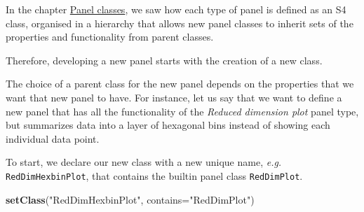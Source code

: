 \documentclass[]{book}
\newenvironment{Shaded}{\begin{snugshade}}{\end{snugshade}}
\newcommand{\DataTypeTok}[1]{\textcolor[rgb]{0.13,0.29,0.53}{#1}}
\newcommand{\KeywordTok}[1]{\textcolor[rgb]{0.13,0.29,0.53}{\textbf{#1}}}
\newcommand{\NormalTok}[1]{#1}
\newcommand{\StringTok}[1]{\textcolor[rgb]{0.31,0.60,0.02}{#1}}
\begin{document}
In the chapter \protect\hyperlink{panels}{Panel classes}, we saw how each type of panel is defined as an S4 class, organised in a hierarchy that allows new panel classes to inherit sets of the properties and functionality from parent classes.

Therefore, developing a new panel starts with the creation of a new class.

The choice of a parent class for the new panel depends on the properties that we want that new panel to have.
For instance, let us say that we want to define a new panel that has all the functionality of the \emph{Reduced dimension plot} panel type, but summarizes data into a layer of hexagonal bins instead of showing each individual data point.

To start, we declare our new class with a new unique name, \emph{e.g.} \texttt{RedDimHexbinPlot}, that contains the builtin panel class \texttt{RedDimPlot}.

\begin{Shaded}
\begin{Highlighting}[]
\KeywordTok{setClass}\NormalTok{(}\StringTok{"RedDimHexbinPlot"}\NormalTok{, }\DataTypeTok{contains=}\StringTok{"RedDimPlot"}\NormalTok{)}
\end{Highlighting}
\end{Shaded}


\end{document}
